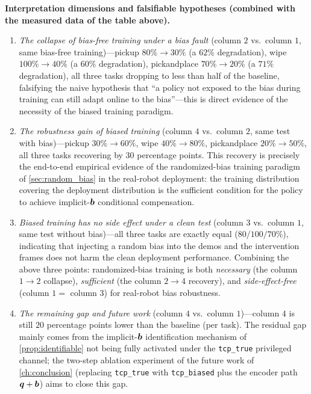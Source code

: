 \textbf{Interpretation dimensions and falsifiable hypotheses (combined with the measured data of the table above).}
\begin{enumerate}
  \item \emph{The collapse of bias-free training under a bias fault} (column $2$ vs.\ column $1$, same bias-free training)---pickup $80\%\to 30\%$ (a $62\%$ degradation), wipe $100\%\to 40\%$ (a $60\%$ degradation), pickandplace $70\%\to 20\%$ (a $71\%$ degradation), all three tasks dropping to less than half of the baseline, falsifying the naive hypothesis that ``a policy not exposed to the bias during training can still adapt online to the bias''---this is direct evidence of the necessity of the biased training paradigm.
  \item \emph{The robustness gain of biased training} (column $4$ vs.\ column $2$, same test with bias)---pickup $30\%\to 60\%$, wipe $40\%\to 80\%$, pickandplace $20\%\to 50\%$, all three tasks recovering by $30$ percentage points. This recovery is precisely the end-to-end empirical evidence of the randomized-bias training paradigm of \cref{sec:random_bias} in the real-robot deployment: the training distribution covering the deployment distribution is the sufficient condition for the policy to achieve implicit-$\bm{b}$ conditional compensation.
  \item \emph{Biased training has no side effect under a clean test} (column $3$ vs.\ column $1$, same test without bias)---all three tasks are exactly equal ($80/100/70\%$), indicating that injecting a random bias into the demos and the intervention frames does not harm the clean deployment performance. Combining the above three points: randomized-bias training is both \emph{necessary} (the column $1\to 2$ collapse), \emph{sufficient} (the column $2\to 4$ recovery), and \emph{side-effect-free} (column $1=$ column $3$) for real-robot bias robustness.
  \item \emph{The remaining gap and future work} (column $4$ vs.\ column $1$)---column $4$ is still $20$ percentage points lower than the baseline (per task). The residual gap mainly comes from the implicit-$\bm{b}$ identification mechanism of \cref{prop:identifiable} not being fully activated under the \texttt{tcp\_true} privileged channel; the two-step ablation experiment of the future work of \cref{ch:conclusion} (replacing \texttt{tcp\_true} with \texttt{tcp\_biased} plus the encoder path $\bm{q}+\bm{b}$) aims to close this gap.
\end{enumerate}

